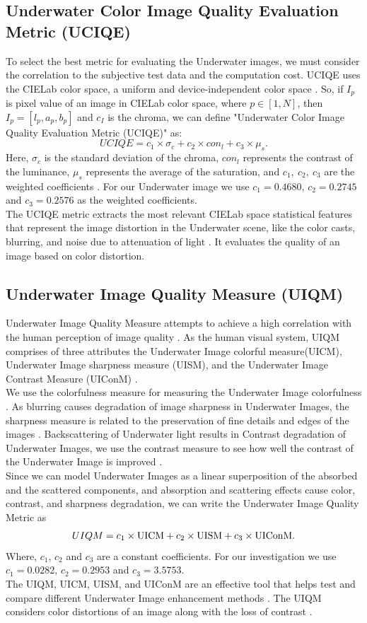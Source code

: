 \documentclass[a4paper,11pt,oneside]{article}
\begin{document}
\subsection{Underwater Color Image Quality Evaluation Metric (UCIQE) \cite{18}}
To select the best metric for evaluating the Underwater images, we must consider the correlation to the subjective test data and the computation cost. UCIQE uses the CIELab color space, a uniform and device-independent color space \cite{18}. So, if $I_p$ is pixel value of an image in CIELab color space, where $p \in [1,N]$, then $I_p = [l_p, a_p, b_p]$ and $c_I$ is the chroma, we can define "Underwater Color Image Quality Evaluation Metric (UCIQE)" \cite{18} as:
$$UCIQE = c_1 \times \sigma_c + c_2 \times con_l + c_3 \times \mu_s.$$
Here, $\sigma_c$ is the standard deviation of the chroma, $con_l$ represents the contrast of the luminance, $\mu_s$ represents the average of the saturation, and $c_1, \: c_2, \: c_3$ are the weighted coefficients \cite{18}. For our Underwater image we use $c_1 = 0.4680$, $c_2 = 0.2745$ and $c_3 = 0.2576$ as the weighted coefficients.\\
The UCIQE metric extracts the most relevant CIELab space statistical features that represent the image distortion in the Underwater scene, like the color casts, blurring, and noise due to attenuation of light \cite{18}. It evaluates the quality of an image based on color distortion.
\subsection{Underwater Image Quality Measure (UIQM) \cite{29}}
Underwater Image Quality Measure attempts to achieve a high correlation with the human perception of image quality \cite{29}. As the human visual system, UIQM comprises of three attributes the Underwater Image colorful measure(UICM), Underwater Image sharpness measure (UISM), and the Underwater Image Contrast Measure (UIConM) \cite{29}.\\
We use the colorfulness measure for measuring the Underwater Image colorfulness \cite{29}. As blurring causes degradation of image sharpness in Underwater Images, the sharpness measure is related to the preservation of fine details and edges of the images \cite{29}. Backscattering of Underwater light results in Contrast degradation of Underwater Images, we use the contrast measure to see how well the contrast of the Underwater Image is improved \cite{29}.\\
Since we can model Underwater Images as a linear superposition of the absorbed and the scattered components, and absorption and scattering effects cause color, contrast, and sharpness degradation, we can write the Underwater Image Quality Metric as \cite{29}
$$UIQM=c_{1} \times {\hbox {UICM}}+c_{2} \times {\hbox {UISM}}+c_{3} \times {\hbox {UIConM}}.$$
Where, $c_1$, $c_2$ and $c_3$ are a constant coefficients. For our investigation we use $c_1=0.0282$, $c_2 = 0.2953$ and $c_3 = 3.5753$.\\
The UIQM, UICM, UISM, and UIConM are an effective tool that helps test and compare different Underwater Image enhancement methods \cite{29}. The UIQM considers color distortions of an image along with the loss of contrast \cite{29}.
\newpage
\end{document}
